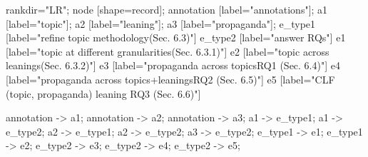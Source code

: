 


 {
    rankdir="LR";
    node [shape=record];
    annotation [label="annotations"];
    a1 [label="topic"];
    a2 [label="leaning"];
    a3 [label="propaganda"];
    e_type1 [label="refine topic methodology\gvnewline (Sec. 6.3)"]
    e_type2 [label="answer RQs"]
    e1 [label="topic at different granularities\gvnewline (Sec. 6.3.1)"]
    e2 [label="topic across leanings\gvnewline (Sec. 6.3.2)"]
    e3 [label="propaganda across topics\gvnewline RQ1 (Sec. 6.4)"]
    e4 [label="propaganda across topics+leanings\gvnewline RQ2 (Sec. 6.5)"]
    e5 [label="CLF (topic, propaganda)  leaning \gvnewline RQ3 (Sec. 6.6)"]
    
    annotation -> a1;
    annotation -> a2;
    annotation -> a3;
    a1 -> e_type1;
    a1 -> e_type2;
    a2 -> e_type1;
    a2 -> e_type2;
    a3 -> e_type2;
    e_type1 -> e1;
    e_type1 -> e2;
    e_type2 -> e3;
    e_type2 -> e4;
    e_type2 -> e5;
}
